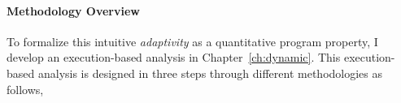 \paragraph{Methodology Overview}
 To formalize this intuitive \emph{adaptivity} as a quantitative program property, 
I develop an execution-based analysis in Chapter~\ref{ch:dynamic}.
 This execution-based analysis is designed in three steps through different methodologies as follows,
